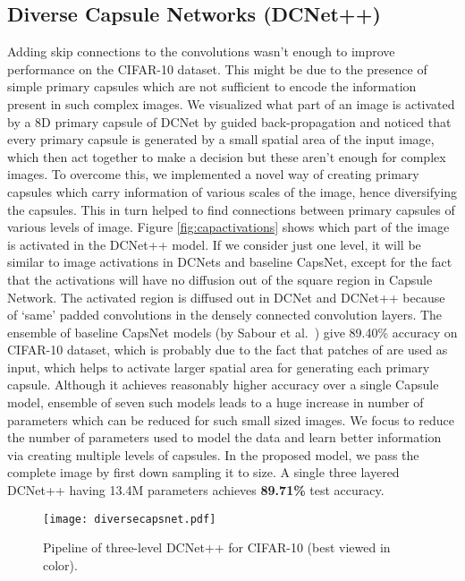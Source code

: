 \documentclass{bmvc2k}
\begin{document}
\subsection{Diverse Capsule Networks (DCNet++)}
\label{sec:diversecapsnet}
Adding skip connections to the convolutions wasn't enough to improve performance on the CIFAR-10 dataset. This might be due to the presence of simple primary capsules which are not sufficient to encode the information present in such complex images. 
We visualized what part of an image is activated by a 8D primary capsule of DCNet by guided back-propagation and noticed that every primary capsule is generated by a small spatial area of the input image, which then act together to make a decision but these aren't enough for complex images. To overcome this, we implemented a novel way of creating primary capsules which carry information of various scales of the image, hence diversifying the capsules. This in turn helped to find connections between primary capsules of various levels of image. Figure \ref{fig:capactivations} shows which part of the image is activated in the DCNet++ model. If we consider just one level, it will be similar to image activations in DCNets and baseline CapsNet, except for the fact that the activations will have no diffusion out of the square region in Capsule Network. The activated region is diffused out in DCNet and DCNet++ because of `same' padded convolutions in the densely connected convolution layers. The ensemble of baseline CapsNet models (by Sabour et al.\ \cite{capsnet}) give 89.40\% accuracy on CIFAR-10 dataset, which is probably due to the fact that patches of  are used as input, which helps to activate larger spatial area for generating each primary capsule. Although it achieves reasonably higher accuracy over a single Capsule model, ensemble of seven such models leads to a huge increase in number of parameters which can be reduced for such small sized images. We focus to reduce the number of parameters used to model the data and learn better information via creating multiple levels of capsules. In the proposed model, we pass the complete image by first down sampling it to  size. A single three layered DCNet++ having 13.4M parameters achieves \textbf{89.71\%} test accuracy.

\begin{figure*}[!htbp]
\begin{center}
\texttt{[image: diversecapsnet.pdf]}
\end{center}
   \vspace*{-4mm}
   \caption{Pipeline of three-level DCNet++ for CIFAR-10 (best viewed in color).}
\label{fig:diversecapsnet}
\end{figure*}
\end{document}
